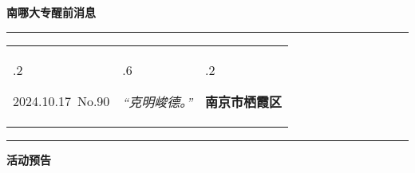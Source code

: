 \documentclass[letterpaper, 12pt]{article}
\begin{document}
\begin{center}
    \Huge\textbf{南哪大专醒前消息}
\end{center}
\vspace{4mm}
\hrule
\renewcommand\tabularxcolumn[1]{m{#1}}
\begin{tabularx}{\textwidth}{>{\hsize.2\hsize}X>{\hsize.6\hsize}X>{\hsize.2\hsize}X}
    \begin{flushleft}
        2024.10.17\, No.90
    \end{flushleft}
    &
    \begin{center}
        \textit{“克明峻德。”}
    \end{center}
    &
    \begin{flushright}
        \textbf{南京市栖霞区}
    \end{flushright}
\end{tabularx}
\vspace{-3.5mm}
\hrule
\vspace{4mm}
\centerline{\huge\textbf{活动预告}}
\end{document}

